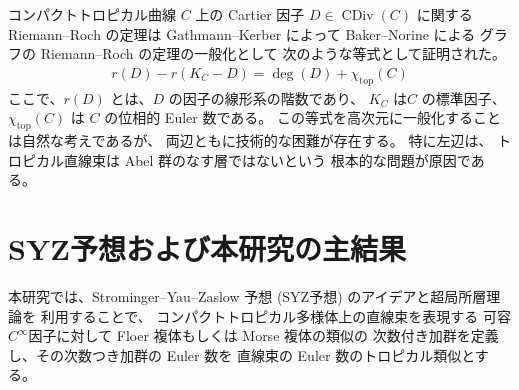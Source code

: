 \documentclass[uplatex,dvipdfmx,12pt]{jsarticle}
\numberwithin{equation}{section}
\theoremstyle{definition}
\newcommand{\opn}[1]{\operatorname{#1}}
\newcommand{\beforesection}{\vspace{-15pt}}
\newcommand{\aftersection}{\vspace{-8pt}}
\begin{document}
コンパクトトロピカル曲線 $C$ 上の Cartier 因子 
$D\in \opn{CDiv}(C)$
に関する Riemann--Roch の定理は
Gathmann--Kerber
\cite{gathmannRiemannRochTheoremTropical2008a} によって 
Baker--Norine による
グラフの Riemann--Roch の定理の一般化として
次のような等式として証明された。
\begin{align} \label{equation-tropical-rr}
r(D)-r(K_C-D)=\opn{deg}(D)+\chi_{\mathrm{top}}(C)
\end{align}
ここで、$r(D)$ とは、$D$ の因子の線形系の階数であり、
$K_C$ は$C$ の標準因子、$\chi_{\mathrm{top}}(C)$ は
$C$ の位相的 Euler 数である。
この等式を高次元に一般化することは自然な考えであるが、
両辺ともに技術的な困難が存在する。
特に左辺は、
トロピカル直線束は Abel 群のなす層ではないという
根本的な問題が原因である。

\beforesection

\section{SYZ予想および本研究の主結果}

\aftersection

本研究では、Strominger--Yau--Zaslow 予想 (SYZ予想)
のアイデアと超局所層理論\cite{MR1299726}を
利用することで、
コンパクトトロピカル多様体上の直線束を表現する 
可容$C^{\infty}$因子に対して
Floer 複体もしくは Morse 複体の類似の
次数付き加群を定義し、その次数つき加群の 
Euler 数を 直線束の Euler 数のトロピカル類似とする。
\end{document}
